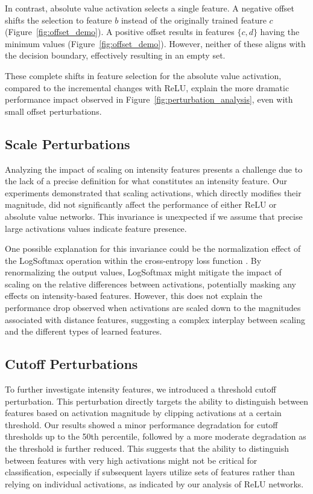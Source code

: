 In contrast, absolute value activation selects a single feature. A negative offset shifts the selection to feature $b$ instead of the originally trained feature $c$ (Figure~\ref{fig:offset_demo}). A positive offset results in features $\{c,d\}$ having the minimum values (Figure~\ref{fig:offset_demo}). However, neither of these aligns with the decision boundary, effectively resulting in an empty set.

These complete shifts in feature selection for the absolute value activation, compared to the incremental changes with ReLU, explain the more dramatic performance impact observed in Figure~\ref{fig:perturbation_analysis}, even with small offset perturbations.

\subsection{Scale Perturbations}

Analyzing the impact of scaling on intensity features presents a challenge due to the lack of a precise definition for what constitutes an intensity feature. Our experiments demonstrated that scaling activations, which directly modifies their magnitude, did not significantly affect the performance of either ReLU or absolute value networks. This invariance is unexpected if we assume that precise large activations values indicate feature presence.

One possible explanation for this invariance could be the normalization effect of the LogSoftmax operation within the cross-entropy loss function \citep{bridle1990probabilistic}. By renormalizing the output values, LogSoftmax might mitigate the impact of scaling on the relative differences between activations, potentially masking any effects on intensity-based features. However, this does not explain the performance drop observed when activations are scaled down to the magnitudes associated with distance features, suggesting a complex interplay between scaling and the different types of learned features.

\subsection{Cutoff Perturbations}

To further investigate intensity features, we introduced a threshold cutoff perturbation. This perturbation directly targets the ability to distinguish between features based on activation magnitude by clipping activations at a certain threshold. Our results showed a minor performance degradation for cutoff thresholds up to the 50th percentile, followed by a more moderate degradation as the threshold is further reduced. This suggests that the ability to distinguish between features with very high activations might not be critical for classification, especially if subsequent layers utilize sets of features rather than relying on individual activations, as indicated by our analysis of ReLU networks.

